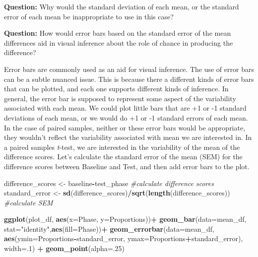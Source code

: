 \documentclass[
]{book}
\newenvironment{Shaded}{\begin{snugshade}}{\end{snugshade}}
\newcommand{\AttributeTok}[1]{\textcolor[rgb]{0.13,0.29,0.53}{#1}}
\newcommand{\CommentTok}[1]{\textcolor[rgb]{0.56,0.35,0.01}{\textit{#1}}}
\newcommand{\DecValTok}[1]{\textcolor[rgb]{0.00,0.00,0.81}{#1}}
\newcommand{\FunctionTok}[1]{\textcolor[rgb]{0.13,0.29,0.53}{\textbf{#1}}}
\newcommand{\NormalTok}[1]{#1}
\newcommand{\OtherTok}[1]{\textcolor[rgb]{0.56,0.35,0.01}{#1}}
\newcommand{\SpecialCharTok}[1]{\textcolor[rgb]{0.81,0.36,0.00}{\textbf{#1}}}
\newcommand{\StringTok}[1]{\textcolor[rgb]{0.31,0.60,0.02}{#1}}
\begin{document}
\textbf{Question:} Why would the standard deviation of each mean, or the standard error of each mean be inappropriate to use in this case?

\textbf{Question:} How would error bars based on the standard error of the mean differences aid in visual inference about the role of chance in producing the difference?

Error bars are commonly used as an aid for visual inference. The use of error bars can be a subtle nuanced issue. This is because there a different kinds of error bars that can be plotted, and each one supports different kinds of inference. In general, the error bar is supposed to represent some aspect of the variability associated with each mean. We could plot little bars that are +1 or -1 standard deviations of each mean, or we would do +1 or -1 standard errors of each mean. In the case of paired samples, neither or these error bars would be appropriate, they wouldn't reflect the variability associated with mean we are interested in. In a paired samples \emph{t}-test, we are interested in the variability of the mean of the difference scores. Let's calculate the standard error of the mean (SEM) for the difference scores between Baseline and Test, and then add error bars to the plot.

\begin{Shaded}
\begin{Highlighting}[]
\NormalTok{difference\_scores }\OtherTok{\textless{}{-}}\NormalTok{ baseline}\SpecialCharTok{{-}}\NormalTok{test\_phase }\CommentTok{\#calculate difference scores}
\NormalTok{standard\_error }\OtherTok{\textless{}{-}} \FunctionTok{sd}\NormalTok{(difference\_scores)}\SpecialCharTok{/}\FunctionTok{sqrt}\NormalTok{(}\FunctionTok{length}\NormalTok{(difference\_scores)) }\CommentTok{\#calculate SEM}


\FunctionTok{ggplot}\NormalTok{(plot\_df, }\FunctionTok{aes}\NormalTok{(}\AttributeTok{x=}\NormalTok{Phase, }\AttributeTok{y=}\NormalTok{Proportions))}\SpecialCharTok{+} 
  \FunctionTok{geom\_bar}\NormalTok{(}\AttributeTok{data=}\NormalTok{mean\_df, }\AttributeTok{stat=}\StringTok{"identity"}\NormalTok{,}\FunctionTok{aes}\NormalTok{(}\AttributeTok{fill=}\NormalTok{Phase))}\SpecialCharTok{+}
  \FunctionTok{geom\_errorbar}\NormalTok{(}\AttributeTok{data=}\NormalTok{mean\_df, }\FunctionTok{aes}\NormalTok{(}\AttributeTok{ymin=}\NormalTok{Proportions}\SpecialCharTok{{-}}\NormalTok{standard\_error, }
                                  \AttributeTok{ymax=}\NormalTok{Proportions}\SpecialCharTok{+}\NormalTok{standard\_error), }\AttributeTok{width=}\NormalTok{.}\DecValTok{1}\NormalTok{) }\SpecialCharTok{+}
  \FunctionTok{geom\_point}\NormalTok{(}\AttributeTok{alpha=}\NormalTok{.}\DecValTok{25}\NormalTok{)}
\end{Highlighting}
\end{Shaded}
\end{document}
